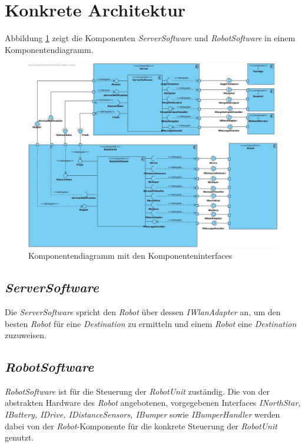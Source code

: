 \section{Konkrete Architektur}

Abbildung \ref{KomponentendiagrammKonkret} zeigt die Komponenten \emph{ServerSoftware} und \emph{RobotSoftware} in einem Komponentendiagramm.

\begin{figure}[H]
\centering
\includegraphics[width=1\textwidth]{img/2-Entwurf-4-KonkreteArchitektur}
\caption{Komponentendiagramm mit den Komponenteninterfaces}
\label{KomponentendiagrammKonkret}
\end{figure}

\subsection{\textit{ServerSoftware}}

Die \emph{ServerSoftware} spricht den \textit{Robot} über dessen \textit{IWlanAdapter} an,
um den besten \textit{Robot} für eine \textit{Destination} zu ermitteln und einem \textit{Robot} eine \textit{Destination} zuzuweisen.

\subsection{\textit{RobotSoftware}}

\emph{RobotSoftware} ist für die Steuerung der \textit{RobotUnit} zuständig. 
Die von der abstrakten Hardware
des \textit{Robot} angebotenen, vorgegebenen Interfaces \textit{INorthStar, IBattery, IDrive, IDistanceSensors, IBumper} sowie
\textit{IBumperHandler} werden dabei von der \textit{Robot}-Komponente für die konkrete Steuerung der \textit{RobotUnit} genutzt.

